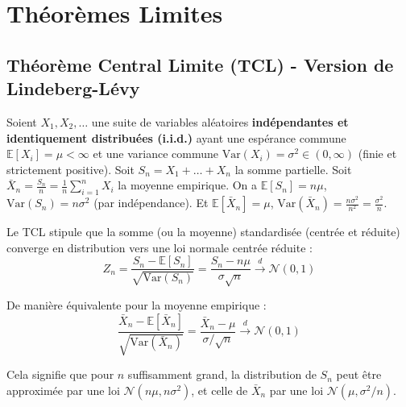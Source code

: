 \section{Théorèmes Limites}

\subsection{Théorème Central Limite (TCL) - Version de Lindeberg-Lévy}

Soient $X_1, X_2, \dots$ une suite de variables aléatoires \textbf{indépendantes et identiquement distribuées (i.i.d.)} ayant une espérance commune $\mathbb{E}[X_i] = \mu < \infty$ et une variance commune $\text{Var}(X_i) = \sigma^2 \in (0, \infty)$ (finie et strictement positive). Soit $S_n = X_1 + \dots + X_n$ la somme partielle. Soit $\bar{X}_n = \frac{S_n}{n} = \frac{1}{n}\sum_{i=1}^n X_i$ la moyenne empirique. On a $\mathbb{E}[S_n] = n\mu$, $\text{Var}(S_n) = n\sigma^2$ (par indépendance). Et $\mathbb{E}[\bar{X}_n] = \mu$, $\text{Var}(\bar{X}_n) = \frac{n\sigma^2}{n^2} = \frac{\sigma^2}{n}$.

Le TCL stipule que la somme (ou la moyenne) standardisée (centrée et réduite) converge en distribution vers une loi normale centrée réduite :
$$Z_n = \frac{S_n - \mathbb{E}[S_n]}{\sqrt{\text{Var}(S_n)}} = \frac{S_n - n\mu}{\sigma\sqrt{n}} \xrightarrow{d} \mathcal{N}(0, 1)$$

De manière équivalente pour la moyenne empirique :
$$\frac{\bar{X}_n - \mathbb{E}[\bar{X}_n]}{\sqrt{\text{Var}(\bar{X}_n)}} = \frac{\bar{X}_n - \mu}{\sigma/\sqrt{n}} \xrightarrow{d} \mathcal{N}(0, 1)$$

Cela signifie que pour $n$ suffisamment grand, la distribution de $S_n$ peut être approximée par une loi $\mathcal{N}(n\mu, n\sigma^2)$, et celle de $\bar{X}_n$ par une loi $\mathcal{N}(\mu, \sigma^2/n)$.

